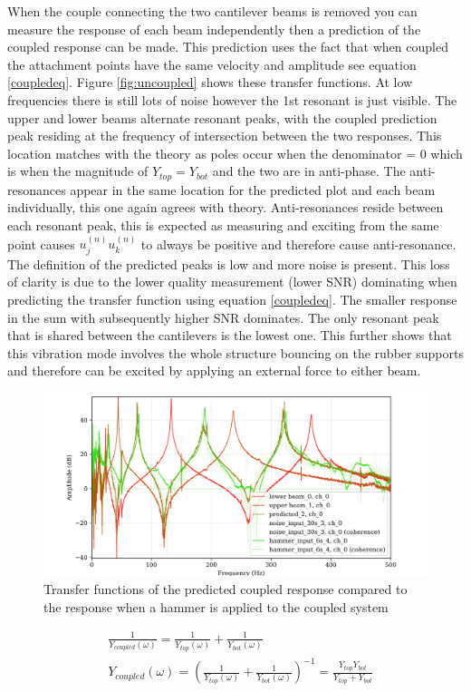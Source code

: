 \documentclass[twoside,onecolumn]{article}
\begin{document}
When the couple connecting the two cantilever beams is removed you can measure the response of each beam independently then a prediction of the coupled response can be made. This prediction uses the fact that when coupled the attachment points have the same velocity and amplitude see equation \ref{coupledeq}. Figure \ref{fig:uncoupled} shows these transfer functions. At low frequencies there is still lots of noise however the 1st resonant is just visible. The upper and lower beams alternate resonant peaks, with the coupled prediction peak residing at the frequency of intersection between the two responses. This location matches with the theory as poles occur when the denominator = 0 which is when the magnitude of $Y_{top}=Y_{bot}$ and the two are in anti-phase. The anti-resonances appear in the same location for the predicted plot and each beam individually, this one again agrees with theory. Anti-resonances reside between each resonant peak, this is expected as measuring and exciting from the same point causes $u_j^{(n)}u_k^{(n)}$ to always be positive and therefore cause anti-resonance. The definition of the predicted peaks is low and more noise is present. This loss of clarity is due to the lower quality measurement (lower SNR) dominating when predicting the transfer function using equation \ref{coupledeq}. The smaller response in the sum with subsequently higher SNR dominates.  The only resonant peak that is shared between the cantilevers is the lowest one. This further shows that this vibration mode involves the whole structure bouncing on the rubber supports and therefore can be excited by applying an external force to either beam.
\begin{figure}[!htb]
  \centering
    \includegraphics[width=\linewidth]{6-coupledcomp}
  \caption{Transfer functions of the predicted coupled response compared to the response when a hammer is applied to the coupled system }
  \label{fig:coupledcomp}
\end{figure}
\begin{equation}
\label{coupledeq}
\begin{split}
&\frac{1}{Y_{coupled}(\omega )}= \frac{1}{Y_{top}(\omega )} + \frac{1}{Y_{bot}(\omega )}\\
&Y_{coupled}(\omega) = (\frac{1}{Y_{top}(\omega )} + \frac{1}{Y_{bot}(\omega )})^{-1}   = \frac{Y_{top} Y_{bot}}{Y_{top}+Y_{bot}} \\
\end{split}
\end{equation}
\end{document}
